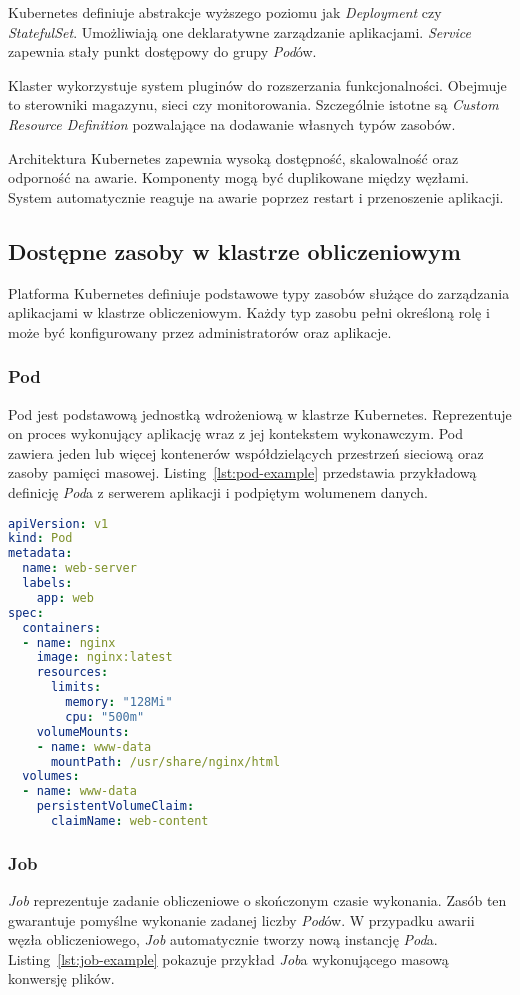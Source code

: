 Kubernetes definiuje abstrakcje wyższego poziomu jak \textit{Deployment} czy \textit{StatefulSet}.
Umożliwiają one deklaratywne zarządzanie aplikacjami. \textit{Service} zapewnia stały punkt dostępowy do grupy \textit{Pod}ów.

Klaster wykorzystuje system pluginów do rozszerzania funkcjonalności.
Obejmuje to sterowniki magazynu, sieci czy monitorowania.
Szczególnie istotne są \textit{Custom Resource Definition} pozwalające na dodawanie własnych typów zasobów.

Architektura Kubernetes zapewnia wysoką dostępność, skalowalność oraz odporność na awarie.
Komponenty mogą być duplikowane między węzłami.
System automatycznie reaguje na awarie poprzez restart i przenoszenie aplikacji.


\subsection{Dostępne zasoby w klastrze obliczeniowym}
Platforma Kubernetes definiuje podstawowe typy zasobów służące do zarządzania aplikacjami w klastrze obliczeniowym.
Każdy typ zasobu pełni określoną rolę i może być konfigurowany przez administratorów oraz aplikacje.

\subsubsection{Pod}
Pod jest podstawową jednostką wdrożeniową w klastrze Kubernetes. 
Reprezentuje on proces wykonujący aplikację wraz z jej kontekstem wykonawczym.
Pod zawiera jeden lub więcej kontenerów współdzielących przestrzeń sieciową oraz zasoby pamięci masowej.
Listing~\ref{lst:pod-example} przedstawia przykładową definicję \textit{Pod}a z serwerem aplikacji i podpiętym wolumenem danych.

\begin{lstlisting}[language=yaml,caption={Przykładowa definicja Pod},label={lst:pod-example}]
apiVersion: v1
kind: Pod
metadata:
  name: web-server
  labels:
    app: web
spec:
  containers:
  - name: nginx
    image: nginx:latest
    resources:
      limits:
        memory: "128Mi"
        cpu: "500m"
    volumeMounts:
    - name: www-data
      mountPath: /usr/share/nginx/html
  volumes:
  - name: www-data
    persistentVolumeClaim:
      claimName: web-content
\end{lstlisting}

\subsubsection{Job}
\textit{Job} reprezentuje zadanie obliczeniowe o skończonym czasie wykonania. 
Zasób ten gwarantuje pomyślne wykonanie zadanej liczby \textit{Pod}ów.
W przypadku awarii węzła obliczeniowego, \textit{Job} automatycznie tworzy nową instancję \textit{Pod}a.
Listing~\ref{lst:job-example} pokazuje przykład \textit{Job}a wykonującego masową konwersję plików.

